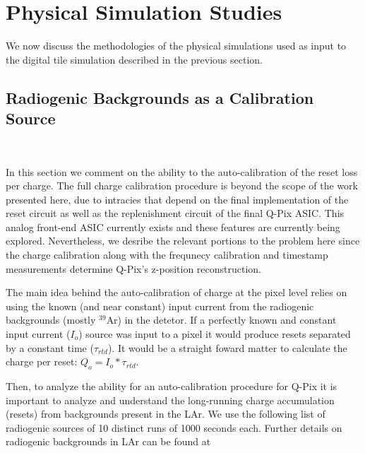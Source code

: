 \section{Physical Simulation Studies}

We now discuss the methodologies of the physical simulations used as input to the digital tile simulation described in the previous section.

\subsection{Radiogenic Backgrounds as a Calibration Source}~\label{sec:radiogenic_calib}

In this section we comment on the ability to the auto-calibration of the reset loss per charge.
The full charge calibration procedure is beyond the scope of the work presented here, due to intracies that depend on the final implementation of the reset circuit as well as the replenishment circuit of the final Q-Pix ASIC.
This analog front-end ASIC currently exists and these features are currently being explored.
Nevertheless, we desribe the relevant portions to the problem here since the charge calibration along with the frequnecy calibration and timestamp measurements determine Q-Pix's z-position reconstruction.

The main idea behind the auto-calibration of charge at the pixel level relies on using the known (and near constant) input current from the radiogenic backgrounds (mostly $^{39}$Ar) in the detetor. 
If a perfectly known and constant input current ($I_{o}$) source was input to a pixel it would produce resets separated by a constant time ($\tau_{rtd}$).
It would be a straight foward matter to calculate the charge per reset: $Q_{o} = I_{o}*\tau_{rtd}$.

Then, to analyze the ability for an auto-calibration procedure for Q-Pix it is important to analyze and understand the long-running charge accumulation (resets) from backgrounds present in the LAr.
We use the following list of radiogenic sources of 10 distinct runs of 1000 seconds each.
Further details on radiogenic backgrounds in LAr can be found at~\citep{DUNE-FD_TDRv4:Abi_2020, ar39_backgrounds, phd_backgrounds}


